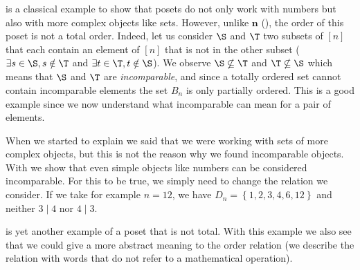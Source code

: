  is a classical example to show that posets do not only
work with numbers but also with more complex objects like sets. However, unlike
$\bm{n}$ (), the order of this poset is not a total order.
Indeed, let us consider $\S$ and $\T$ two subsets of $[n]$ that each contain an
element of $[n]$ that is not in the other subset ($\exists s \in \S, s \notin
\T$ and $\exists t \in \T, t \notin \S$). We observe $\S \nsubseteq \T$ and $\T
\nsubseteq \S$ which means that $\S$ and $\T$ are \emph{incomparable}, and since a
totally ordered set cannot contain incomparable elements the set $B_n$ is only
partially ordered. This is a good example since we now understand what
incomparable can mean for a pair of elements.

When we started to explain  we said that we were working
with sets of more complex objects, but this is not the reason why we found
incomparable objects. With  we show that even simple
objects like numbers can be considered incomparable. For this to be true, we
simply need to change the relation we consider. If we take for example $n =
12$, we have $D_n = \left\{{1, 2, 3, 4, 6, 12}\right\}$ and neither $3 \mid 4$
nor $4 \mid 3$.

 is yet another example of a poset that is not total. With
this example we also see that we could give a more abstract meaning to the
order relation (we describe the relation with words that do not refer to a
mathematical operation).
